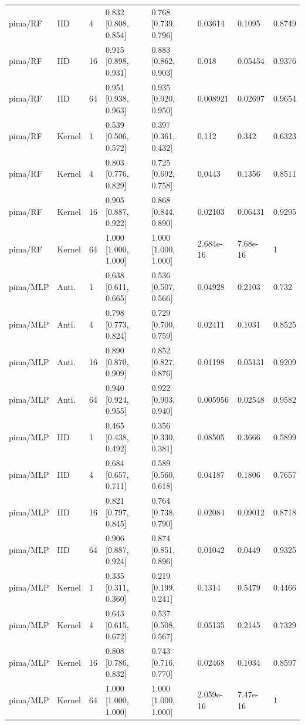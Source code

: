 \begin{tabular}{llllllll}
pima/RF & IID & 4 & 0.832 [0.808, 0.854] & 0.768 [0.739, 0.796] & 0.03614 & 0.1095 & 0.8749 \\
pima/RF & IID & 16 & 0.915 [0.898, 0.931] & 0.883 [0.862, 0.903] & 0.018 & 0.05454 & 0.9376 \\
pima/RF & IID & 64 & 0.951 [0.938, 0.963] & 0.935 [0.920, 0.950] & 0.008921 & 0.02697 & 0.9654 \\
pima/RF & Kernel & 1 & 0.539 [0.506, 0.572] & 0.397 [0.361, 0.432] & 0.112 & 0.342 & 0.6323 \\
pima/RF & Kernel & 4 & 0.803 [0.776, 0.829] & 0.725 [0.692, 0.758] & 0.0443 & 0.1356 & 0.8511 \\
pima/RF & Kernel & 16 & 0.905 [0.887, 0.922] & 0.868 [0.844, 0.890] & 0.02103 & 0.06431 & 0.9295 \\
pima/RF & Kernel & 64 & 1.000 [1.000, 1.000] & 1.000 [1.000, 1.000] & 2.684e-16 & 7.68e-16 & 1 \\
pima/MLP & Anti. & 1 & 0.638 [0.611, 0.665] & 0.536 [0.507, 0.566] & 0.04928 & 0.2103 & 0.732 \\
pima/MLP & Anti. & 4 & 0.798 [0.773, 0.824] & 0.729 [0.700, 0.759] & 0.02411 & 0.1031 & 0.8525 \\
pima/MLP & Anti. & 16 & 0.890 [0.870, 0.909] & 0.852 [0.827, 0.876] & 0.01198 & 0.05131 & 0.9209 \\
pima/MLP & Anti. & 64 & 0.940 [0.924, 0.955] & 0.922 [0.903, 0.940] & 0.005956 & 0.02548 & 0.9582 \\
pima/MLP & IID & 1 & 0.465 [0.438, 0.492] & 0.356 [0.330, 0.381] & 0.08505 & 0.3666 & 0.5899 \\
pima/MLP & IID & 4 & 0.684 [0.657, 0.711] & 0.589 [0.560, 0.618] & 0.04187 & 0.1806 & 0.7657 \\
pima/MLP & IID & 16 & 0.821 [0.797, 0.845] & 0.764 [0.738, 0.790] & 0.02084 & 0.09012 & 0.8718 \\
pima/MLP & IID & 64 & 0.906 [0.887, 0.924] & 0.874 [0.851, 0.896] & 0.01042 & 0.0449 & 0.9325 \\
pima/MLP & Kernel & 1 & 0.335 [0.311, 0.360] & 0.219 [0.199, 0.241] & 0.1314 & 0.5479 & 0.4466 \\
pima/MLP & Kernel & 4 & 0.643 [0.615, 0.672] & 0.537 [0.508, 0.567] & 0.05135 & 0.2145 & 0.7329 \\
pima/MLP & Kernel & 16 & 0.808 [0.786, 0.832] & 0.743 [0.716, 0.770] & 0.02468 & 0.1034 & 0.8597 \\
pima/MLP & Kernel & 64 & 1.000 [1.000, 1.000] & 1.000 [1.000, 1.000] & 2.059e-16 & 7.47e-16 & 1 \\
\bottomrule
\end{tabular}

\endgroup
